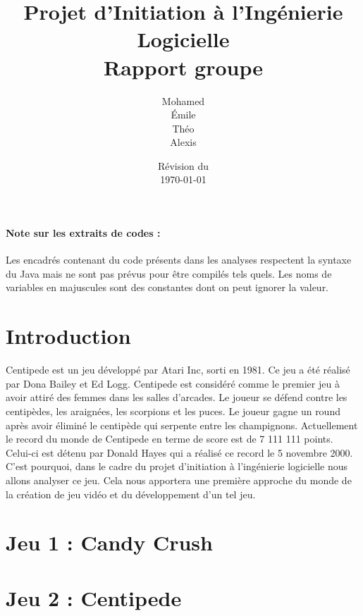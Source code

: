 \documentclass[a4paper, 12pt, oneside]{article}
\title{Projet d'Initiation à l'Ingénierie Logicielle\\Rapport groupe \no 3}
\author{Mohamed \bsc{Lakhal}\\Émile \bsc{Jeannin}\\Théo \bsc{Mottet}\\Alexis \bsc{Cabodi}}
\date{Révision du\\\today}
\begin{document}
\maketitle
\newpage
\tableofcontents
\bigskip
\paragraph*{Note sur les extraits de codes :} Les encadrés contenant du code présents dans les analyses respectent la syntaxe du Java mais ne sont pas prévus pour être compilés tels quels. Les noms de variables en majuscules sont des constantes dont on peut ignorer la valeur.
\newpage

\section{Introduction}
Centipede est un jeu développé par Atari Inc, sorti en 1981. Ce jeu a été réalisé par Dona Bailey et Ed Logg. Centipede est considéré comme le premier jeu à avoir attiré des femmes dans les salles d'arcades. 
Le joueur se défend contre les centipèdes, les araignées, les scorpions et les puces. Le joueur gagne un round après avoir éliminé le centipède qui serpente entre les champignons. Actuellement le record du monde de Centipede en terme de score est de 7 111 111 points. Celui-ci est détenu par Donald Hayes qui a réalisé ce record le 5 novembre 2000. 
C'est pourquoi, dans le cadre du projet d'initiation à l'ingénierie logicielle nous allons analyser ce jeu. Cela nous apportera une première approche du monde de la création de jeu vidéo et du développement d'un tel jeu. 

\section{Jeu 1 : Candy Crush}


\section{Jeu 2 : Centipede}

\end{document}
